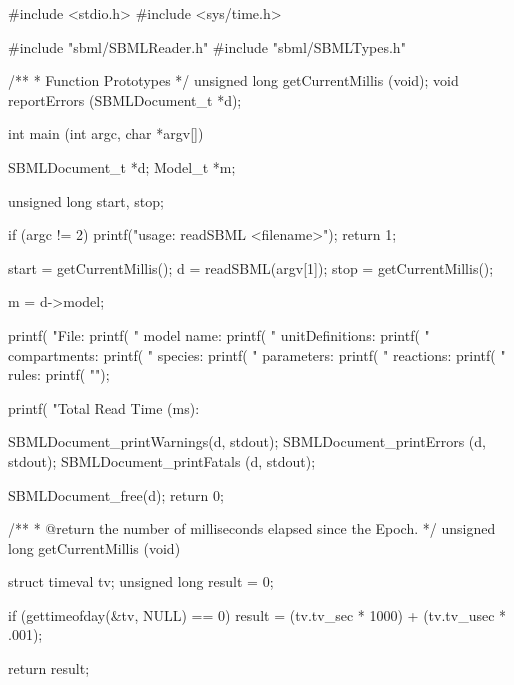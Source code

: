 \documentclass{cekmanual}
\begin{document}
\begin{codeVerbatim}[C,flexiblecolumns=false]
#include <stdio.h>
#include <sys/time.h>

#include "sbml/SBMLReader.h"
#include "sbml/SBMLTypes.h"

/**
 * Function Prototypes
 */
unsigned long getCurrentMillis (void);
void          reportErrors     (SBMLDocument_t *d);


int
main (int argc, char *argv[])
{
  SBMLDocument_t *d;
  Model_t *m;

  unsigned long start, stop;


  if (argc != 2)
  {
    printf("usage: readSBML <filename>\n");
    return 1;
  }

  start = getCurrentMillis();
  d     = readSBML(argv[1]);
  stop  = getCurrentMillis();

  m = d->model;

  printf( "File: %
  printf( "       model name: %
  printf( "  unitDefinitions: %
  printf( "     compartments: %
  printf( "          species: %
  printf( "       parameters: %
  printf( "        reactions: %
  printf( "            rules: %
  printf( "\n");

  printf( "Total Read Time (ms): %

  SBMLDocument_printWarnings(d, stdout);
  SBMLDocument_printErrors  (d, stdout);
  SBMLDocument_printFatals  (d, stdout);

  SBMLDocument_free(d);
  return 0;
}


/**
 * @return the number of milliseconds elapsed since the Epoch.
 */
unsigned long
getCurrentMillis (void)
{
  struct timeval tv;
  unsigned long  result = 0;


  if (gettimeofday(&tv, NULL) == 0)
  {
    result = (tv.tv_sec * 1000) + (tv.tv_usec * .001);
  }

  return result;
}
\end{codeVerbatim}

\end{document}
